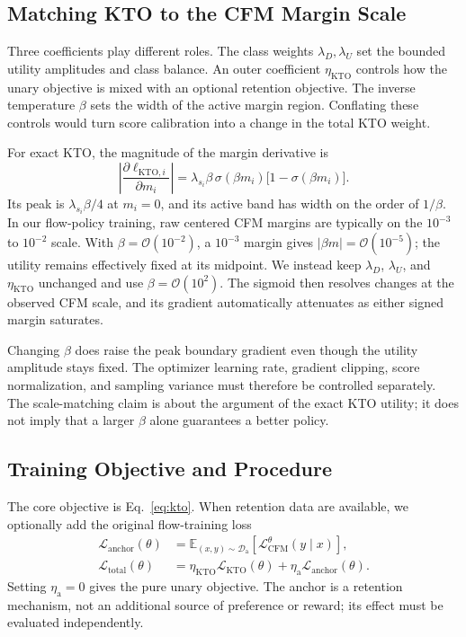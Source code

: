 \documentclass[10pt]{article}
\newcommand{\E}{\mathbb{E}}
\newcommand{\Danchor}{\mathcal{D}_{\mathrm{a}}}
\newcommand{\Lcfm}{\mathcal{L}_{\mathrm{CFM}}}
\newcommand{\Lkto}{\mathcal{L}_{\mathrm{KTO}}}
\begin{document}
\subsection{Matching KTO to the CFM Margin Scale}

Three coefficients play different roles. The class weights
$\lambda_D,\lambda_U$ set the bounded utility amplitudes and class balance. An
outer coefficient $\eta_{\mathrm{KTO}}$ controls how the unary objective is
mixed with an optional retention objective. The inverse temperature $\beta$
sets the width of the active margin region. Conflating these controls would
turn score calibration into a change in the total KTO weight.

For exact KTO, the magnitude of the margin derivative is
\begin{equation}
    \left|\frac{\partial\ell_{\mathrm{KTO},i}}
                    {\partial m_i}\right|
    =\lambda_{s_i}\beta\,
      \sigma(\beta m_i)\bigl[1-\sigma(\beta m_i)\bigr].
    \label{eq:margin-gradient}
\end{equation}
Its peak is $\lambda_{s_i}\beta/4$ at $m_i=0$, and its active band has width
on the order of $1/\beta$. In our flow-policy training, raw centered CFM margins
are typically on the $10^{-3}$ to $10^{-2}$ scale. With
$\beta=\mathcal{O}(10^{-2})$, a $10^{-3}$ margin gives
$|\beta m|=\mathcal{O}(10^{-5})$; the utility remains effectively fixed at its
midpoint. We instead keep $\lambda_D$, $\lambda_U$, and
$\eta_{\mathrm{KTO}}$ unchanged and use $\beta=\mathcal{O}(10^{2})$. The
sigmoid then resolves changes at the observed CFM scale, and its gradient
automatically attenuates as either signed margin saturates.

Changing $\beta$ does raise the peak boundary gradient even though the utility
amplitude stays fixed. The optimizer learning rate, gradient clipping, score
normalization, and sampling variance must therefore be controlled separately.
The scale-matching claim is about the argument of the exact KTO utility; it does
not imply that a larger $\beta$ alone guarantees a better policy.

\subsection{Training Objective and Procedure}

The core objective is Eq.~\eqref{eq:kto}. When retention data are available, we
optionally add the original flow-training loss
\begin{align}
    \mathcal{L}_{\mathrm{anchor}}(\theta)
    &=\E_{(x,y)\sim\Danchor}\left[\Lcfm^\theta(y\mid x)\right], \\
    \mathcal{L}_{\mathrm{total}}(\theta)
    &=\eta_{\mathrm{KTO}}\Lkto(\theta)
      +\eta_{\mathrm{a}}\mathcal{L}_{\mathrm{anchor}}(\theta).
    \label{eq:total}
\end{align}
Setting $\eta_{\mathrm{a}}=0$ gives the pure unary objective. The anchor is a
retention mechanism, not an additional source of preference or reward; its
effect must be evaluated independently.
\end{document}
